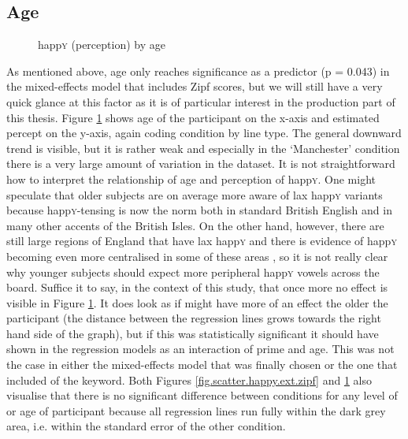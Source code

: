 \subsection{Age}
\label{sec.perc_res.happy.age}

\begin{figure}[h]
	\centering
		\resizebox{.49\linewidth}{!}{} 
	\caption{happ\textsc{y} (perception) by age}
	\label{fig.scatter.happy.ext.age}
\end{figure}

As mentioned above, age only reaches significance as a predictor (p = 0.043) in the mixed-effects model that includes Zipf scores, but we will still have a very quick glance at this factor as it is of particular interest in the production part of this thesis.
Figure \ref{fig.scatter.happy.ext.age} shows age of the participant on the x-axis and estimated percept on the y-axis, again coding  condition by line type.
The general downward trend is visible, but it is rather weak and especially in the `Manchester' condition there is a very large amount of variation in the dataset.
It is not straightforward how to interpret the relationship of age and perception of happ\textsc{y}.
One might speculate that older subjects are on average more aware of lax happ\textsc{y} variants because happ\textsc{y}-tensing is now the norm both in standard British English and in many other accents of the British Isles.
On the other hand, however, there are still large regions of England that have lax happ\textsc{y} and there is evidence of happ\textsc{y} becoming even more centralised in some of these areas \parencite[cf.][]{flynn2010}, so it is not really clear why younger subjects should expect more peripheral happ\textsc{y} vowels across the board.
Suffice it to say, in the context of this study, that once more no  effect is visible in Figure \ref{fig.scatter.happy.ext.age}.
It does look as if  might have more of an effect the older the participant (the distance between the regression lines grows towards the right hand side of the graph), but if this was statistically significant it should have shown in the regression models as an interaction of prime and age.
This was not the case in either the mixed-effects model that was finally chosen or the one that included  of the keyword.
Both Figures \ref{fig.scatter.happy.ext.zipf} and \ref{fig.scatter.happy.ext.age} also visualise that there is no significant difference between  conditions for any level of  or age of participant because all regression lines run fully within the dark grey area, i.e. within the standard error of the other condition.

